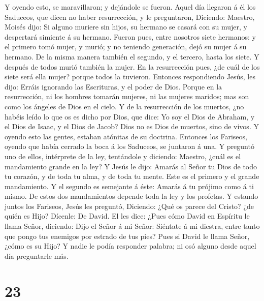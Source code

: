  Y oyendo esto, se maravillaron; y dejándole se fueron.
 Aquel día llegaron á él los Saduceos, que dicen no haber
resurrección, y le preguntaron,  Diciendo: Maestro, Moisés
dijo: Si alguno muriere sin hijos, su hermano se casará con su mujer, y
despertará simiente á su hermano.  Fueron pues, entre
nosotros siete hermanos: y el primero tomó mujer, y murió; y no teniendo
generación, dejó su mujer á su hermano.  De la misma manera
también el segundo, y el tercero, hasta los siete.  Y
después de todos murió también la mujer.  En la
resurrección pues, ¿de cuál de los siete será ella mujer? porque todos
la tuvieron.  Entonces respondiendo Jesús, les dijo: Erráis
ignorando las Escrituras, y el poder de Dios.  Porque en la
resurrección, ni los hombres tomarán mujeres, ni las mujeres maridos;
mas son como los ángeles de Dios en el cielo.  Y de la
resurrección de los muertos, ¿no habéis leído lo que os es dicho por
Dios, que dice:  Yo soy el Dios de Abraham, y el Dios de
Isaac, y el Dios de Jacob? Dios no es Dios de muertos, sino de vivos.
 Y oyendo esto las gentes, estaban atónitas de su doctrina.
 Entonces los Fariseos, oyendo que había cerrado la boca á
los Saduceos, se juntaron á una.  Y preguntó uno de ellos,
intérprete de la ley, tentándole y diciendo:  Maestro,
¿cuál es el mandamiento grande en la ley?  Y Jesús le dijo:
Amarás al Señor tu Dios de todo tu corazón, y de toda tu alma, y de toda
tu mente.  Este es el primero y el grande mandamiento.
 Y el segundo es semejante á éste: Amarás á tu prójimo como
á ti mismo.  De estos dos mandamientos depende toda la ley
y los profetas.  Y estando juntos los Fariseos, Jesús les
preguntó,  Diciendo: ¿Qué os parece del Cristo? ¿de quién
es Hijo? Dícenle: De David.  El les dice: ¿Pues cómo David
en Espíritu le llama Señor, diciendo:  Dijo el Señor á mi
Señor: Siéntate á mi diestra, entre tanto que pongo tus enemigos por
estrado de tus pies?  Pues si David le llama Señor, ¿cómo
es su Hijo?  Y nadie le podía responder palabra; ni osó
alguno desde aquel día preguntarle más.

\hypertarget{section-22}{%
\section{23}\label{section-22}}

